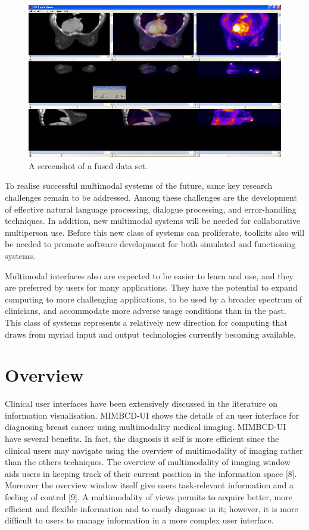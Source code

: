 \clearpage

\begin{figure}[!hbt]
\centering
\includegraphics[width=1.00\textwidth]{multimodalbreastimage.png}
\caption{\label{fig:screenshot}A screenshot of a fused data set.
}
\end{figure}

To realise successful multimodal systems of the future, same key research challenges remain to be addressed. Among these challenges are the development of effective natural language processing, dialogue processing, and error-handling techniques. In addition, new multimodal systems will be needed for collaborative multiperson use. Before this new class of systems can proliferate, toolkits also will be needed to promote software development for both simulated and functioning systems.

Multimodal interfaces also are expected to be easier to learn and use, and they are preferred by users for many applications. They have the potential to expand computing to more challenging applications, to be used by a broader spectrum of clinicians, and accommodate more adverse usage conditions than in the past. This class of systems represents a relatively new direction for computing that draws from myriad input and output technologies currently becoming available.

\section{Overview}

Clinical user interfaces have been extensively discussed in the literature on information visualisation. MIMBCD-UI shows the details of an user interface for diagnosing breast cancer using multimodality medical imaging. MIMBCD-UI have several benefits. In fact, the diagnosis it self is more efficient since the clinical users may navigate using the overview of multimodality of imaging rather than the others techniques. The overview of multimodality of imaging window aids users in keeping track of their current position in the information space [8]. Moreover the overview window itself give users task-relevant information and a feeling of control [9]. A multimodality of views permits to acquire better, more efficient and flexible information and to easily diagnose in it; however, it is more difficult to users to manage information in a more complex user interface.

